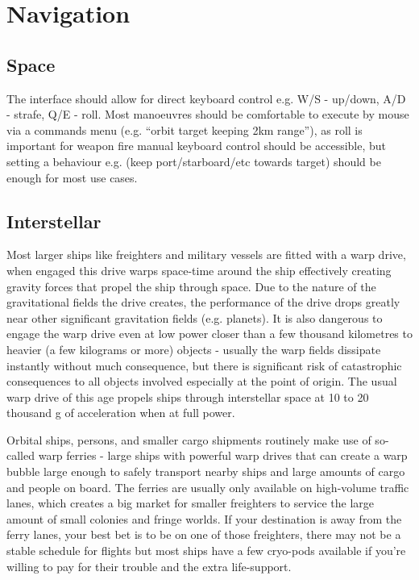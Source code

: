 \documentclass[a4paper,10pt]{article}
\begin{document}
\section{Navigation}
\begin{multicols}{2}

\subsection{Space}
The interface should allow for direct keyboard control e.g. W/S - up/down, A/D
- strafe, Q/E - roll. Most manoeuvres should be comfortable to execute by mouse
via a commands menu (e.g. ``orbit target keeping 2km range''), as roll is
important for weapon fire manual keyboard control should be accessible, but
setting a behaviour e.g. (keep port/starboard/etc towards target) should be
enough for most use cases.

\subsection{Interstellar}
Most larger ships like freighters and military vessels are fitted with a warp
drive, when engaged this drive warps space-time around the ship effectively
creating gravity forces that propel the ship through space. Due to the nature
of the gravitational fields the drive creates, the performance of the drive
drops greatly near other significant gravitation fields (e.g. planets). It is
also dangerous to engage the warp drive even at low power closer than a few
thousand kilometres to heavier (a few kilograms or more) objects - usually the
warp fields dissipate instantly without much consequence, but there is
significant risk of catastrophic consequences to all objects involved
especially at the point of origin. The usual warp drive of this age propels
ships through interstellar space at 10 to 20 thousand g of acceleration when at
full power.


Orbital ships, persons, and smaller cargo shipments routinely make use of
so-called warp ferries - large ships with powerful warp drives that can create
a warp bubble large enough to safely transport nearby ships and large amounts
of cargo and people on board. The ferries are usually only available on
high-volume traffic lanes, which creates a big market for smaller freighters to
service the large amount of small colonies and fringe worlds. If your
destination is away from the ferry lanes, your best bet is to be on one of
those freighters, there may not be a stable schedule for flights but most ships
have a few cryo-pods available if you're willing to pay for their trouble and
the extra life-support.


\end{multicols}
\end{document}

